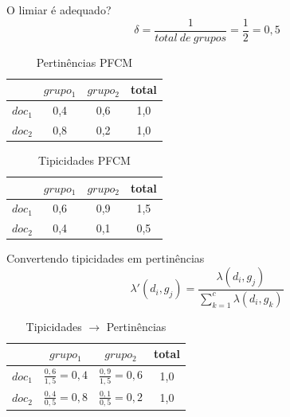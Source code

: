\documentclass[brazil]{beamer}
\begin{document}
\begin{frame}{O limiar é adequado?}
  \begin{equation}
    \delta = \frac{1}{total\ de\ grupos} = \frac{1}{2} = 0,5
  \end{equation}
    \begin{table}[!htp]
      \centering
      \begin{tabular}{ |l|c|c|c|}
        \hline
        & {\bf$grupo_1$} & {\bf $grupo_2$} & {\alert{total}} \\
        \hline
        $doc_1$ & 0,4 & 0,6 & 1,0 \\
        \hline
        $doc_2$ & 0,8 & 0,2 & 1,0 \\
        \hline
      \end{tabular}
      \caption{Pertinências PFCM}
    \end{table}
    \begin{table}[!htp]
      \centering
      \begin{tabular}{ |l|c|c|c|}
        \hline
        & {\bf$grupo_1$} & {\bf $grupo_2$} & \alert{total} \\
        \hline
        $doc_1$ & 0,6 & 0,9 & 1,5 \\
        \hline
        $doc_2$ & 0,4 & 0,1 & 0,5 \\
        \hline
      \end{tabular}
      \caption{Tipicidades PFCM}
    \end{table}
\end{frame}

\begin{frame}{Convertendo tipicidades em pertinências}
  \begin{equation}
    \lambda'(d_i,g_j) = \frac{\lambda(d_i,g_j)}{\sum_{k=1}^c \lambda(d_i,g_k)}
    \label{eq:tip2pert}
  \end{equation}

  \begin{table}[!htp]
    \centering
    \begin{tabular}{ |l|c|c|c|}
      \hline
      & {\bf$grupo_1$} & {\bf $grupo_2$} & \alert{total} \\
      \hline
      $doc_1$ & $\frac{0,6}{1,5} = 0,4$ & $\frac{0,9}{1,5} = 0,6$ & 1,0 \\
      \hline
      $doc_2$ & $\frac{0,4}{0,5} = 0,8$ & $\frac{0,1}{0,5} = 0,2$ & 1,0 \\
      \hline
    \end{tabular}
    \caption{Tipicidades $\rightarrow$ Pertinências}
  \end{table}
\end{frame}
\end{document}
